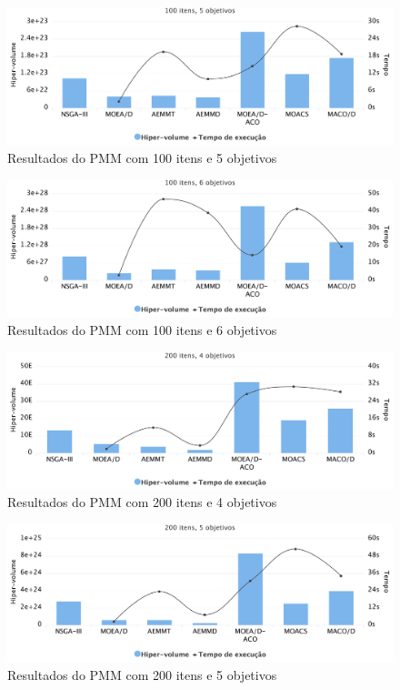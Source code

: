 \begin{figure}[!htbp]	
	\includegraphics[width=1\textwidth]{cap_experimentos/figs/etapa4/i100o5}
	\caption{\label{fig_exp4_i100o5}Resultados do PMM com 100 itens e 5 objetivos}
\end{figure}

\begin{figure}[!htbp]	
	\includegraphics[width=1\textwidth]{cap_experimentos/figs/etapa4/i100o6}
	\caption{\label{fig_exp4_i100o6}Resultados do PMM com 100 itens e 6 objetivos}
\end{figure}

\begin{figure}[!htbp]	
	\includegraphics[width=1\textwidth]{cap_experimentos/figs/etapa4/i200o4}
	\caption{\label{fig_exp4_i200o4}Resultados do PMM com 200 itens e 4 objetivos}
\end{figure}

\begin{figure}[!htbp]	
	\includegraphics[width=1\textwidth]{cap_experimentos/figs/etapa4/i200o5}
	\caption{\label{fig_exp4_i200o5}Resultados do PMM com 200 itens e 5 objetivos}
\end{figure}

